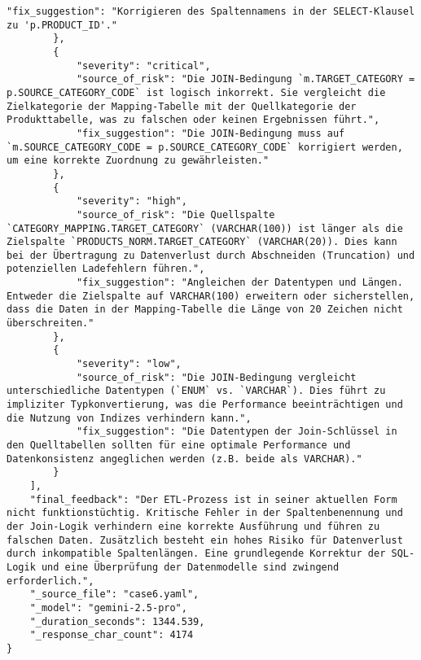 \begin{lstlisting}[caption={Ausgabe: Gemini 2.5 Pro Anwendungsfall 6 Hauptdurchlauf},label={gemini_case6_prompt1}]
            "fix_suggestion": "Korrigieren des Spaltennamens in der SELECT-Klausel zu 'p.PRODUCT_ID'."
        },
        {
            "severity": "critical",
            "source_of_risk": "Die JOIN-Bedingung `m.TARGET_CATEGORY = p.SOURCE_CATEGORY_CODE` ist logisch inkorrekt. Sie vergleicht die Zielkategorie der Mapping-Tabelle mit der Quellkategorie der Produkttabelle, was zu falschen oder keinen Ergebnissen führt.",
            "fix_suggestion": "Die JOIN-Bedingung muss auf `m.SOURCE_CATEGORY_CODE = p.SOURCE_CATEGORY_CODE` korrigiert werden, um eine korrekte Zuordnung zu gewährleisten."
        },
        {
            "severity": "high",
            "source_of_risk": "Die Quellspalte `CATEGORY_MAPPING.TARGET_CATEGORY` (VARCHAR(100)) ist länger als die Zielspalte `PRODUCTS_NORM.TARGET_CATEGORY` (VARCHAR(20)). Dies kann bei der Übertragung zu Datenverlust durch Abschneiden (Truncation) und potenziellen Ladefehlern führen.",
            "fix_suggestion": "Angleichen der Datentypen und Längen. Entweder die Zielspalte auf VARCHAR(100) erweitern oder sicherstellen, dass die Daten in der Mapping-Tabelle die Länge von 20 Zeichen nicht überschreiten."
        },
        {
            "severity": "low",
            "source_of_risk": "Die JOIN-Bedingung vergleicht unterschiedliche Datentypen (`ENUM` vs. `VARCHAR`). Dies führt zu impliziter Typkonvertierung, was die Performance beeinträchtigen und die Nutzung von Indizes verhindern kann.",
            "fix_suggestion": "Die Datentypen der Join-Schlüssel in den Quelltabellen sollten für eine optimale Performance und Datenkonsistenz angeglichen werden (z.B. beide als VARCHAR)."
        }
    ],
    "final_feedback": "Der ETL-Prozess ist in seiner aktuellen Form nicht funktionstüchtig. Kritische Fehler in der Spaltenbenennung und der Join-Logik verhindern eine korrekte Ausführung und führen zu falschen Daten. Zusätzlich besteht ein hohes Risiko für Datenverlust durch inkompatible Spaltenlängen. Eine grundlegende Korrektur der SQL-Logik und eine Überprüfung der Datenmodelle sind zwingend erforderlich.",
    "_source_file": "case6.yaml",
    "_model": "gemini-2.5-pro",
    "_duration_seconds": 1344.539,
    "_response_char_count": 4174
}
\end{lstlisting}

